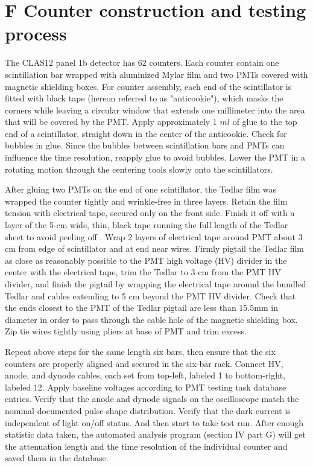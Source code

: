 \section{
F Counter construction and testing process}

 The CLAS12 panel 1b detector has $62$ counters. Each counter contain one scintillation bar wrapped with aluminized Mylar film and two PMTs covered with magnetic shielding boxes. For counter assembly, each end of the scintillator is fitted with black tape (hereon referred to as "anticookie"), which masks the corners while leaving a circular window that extends one millimeter into the area that will be covered by the PMT. Apply approximately 1 $ml$ of glue to the top end of a scintillator, straight down in the center of the anticookie. Check for bubbles in glue. Since the bubbles between scintillation bars and PMTs can influence the time resolution, reapply glue to avoid bubbles. Lower the PMT in a rotating motion through the centering tools slowly onto the scintillators.

After gluing two PMTs on the end of one scintillator, the Tedlar film was wrapped the counter tightly and wrinkle-free in three layers. Retain the film
tension with electrical tape, secured only on the front side. Finish it off with a
layer of the 5-cm wide, thin, black tape running the full length of the Tedlar
sheet to avoid peeling off . Wrap 2 layers of electrical tape around PMT about $3$ cm from edge of scintillator
and at end near wires. Firmly pigtail the Tedlar film as close as reasonably possible to the PMT high voltage (HV) divider in the center with the electrical tape, trim the Tedlar to 3 cm from the
PMT HV divider, and finish the pigtail by wrapping the electrical tape around
the bundled Tedlar and cables extending to 5 cm beyond the PMT HV divider. Check that the ends closest to the PMT of the Tedlar pigtail are less than $15.5$mm in diameter in order to pass through the cable hole of the magnetic shielding box. Zip tie wires tightly using pliers at base of PMT and trim excess.

Repeat above steps for the same length six bars, then ensure that the six counters are properly aligned and secured in the six-bar rack. Connect HV, anode, and dynode cables, each set from top-left, labeled 1 to bottom-right, labeled 12. Apply baseline voltages according to PMT testing task database entries. Verify that the anode and dynode signals on the oscilloscope match the nominal documented pulse-shape distribution. Verify that the dark current is independent of light on/off status. And then start to take test run. After enough statistic data taken, the automated analysis program (section IV part G) will get the attenuation length and the time resolution of the individual counter and saved them in the database.


